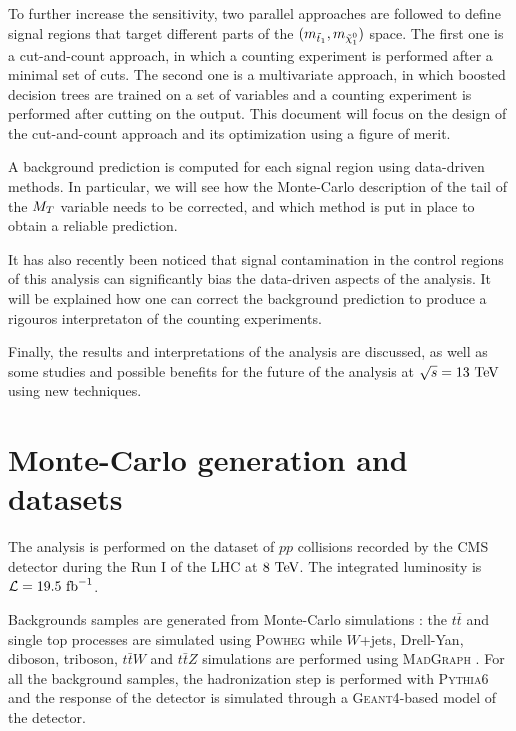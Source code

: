     To further increase the sensitivity, two parallel approaches are followed to define
    signal regions that target different parts of the $(m_{\tilde{t}_1},m_{\tilde{\chi}_1^0})$
    space. The first one is a cut-and-count approach, in which a counting experiment is performed
    after a minimal set of cuts. The second one is a multivariate approach, in which boosted
    decision trees are trained on a set of variables and a counting experiment is performed
    after cutting on the output. This document will focus on the design of the cut-and-count
    approach and its optimization using a figure of merit.

    A background prediction is computed for each signal region using data-driven methods.
    In particular, we will see how the Monte-Carlo description of the tail of the $M_T$
    variable needs to be corrected, and which method is put in place to obtain a reliable
    prediction.

    It has also recently been noticed that signal contamination in the control regions of
    this analysis can significantly bias the data-driven aspects of the analysis. It will
    be explained how one can correct the background prediction to produce a rigouros
    interpretaton of the counting experiments.

    Finally, the results and interpretations of the analysis are discussed, as well as
    some studies and possible benefits for the future of the analysis at $\sqrt{s}=13~\text{TeV}$
    using new techniques.

    \section{Monte-Carlo generation and datasets}

    The analysis is performed on the dataset of $pp$ collisions recorded by the CMS detector
    during the Run I of the LHC at $8~\text{TeV}$. The integrated luminosity is $\mathcal{L} =
    19.5~\text{fb}^{-1}$.

    Backgrounds samples are generated from Monte-Carlo simulations : the $t\bar{t}$ and
    single top processes are simulated using \textsc{Powheg} \cite{Powheg} while $W$+jets,
    Drell-Yan, diboson, triboson, $t\bar{t}W$ and $t\bar{t}Z$ simulations are performed
    using \textsc{MadGraph} \cite{Madgraph}. For all the background samples, the
    hadronization step is performed with \textsc{Pythia}6 \cite{Pythia} and the response of
    the detector is simulated through a \textsc{Geant4}-based model of the detector.

